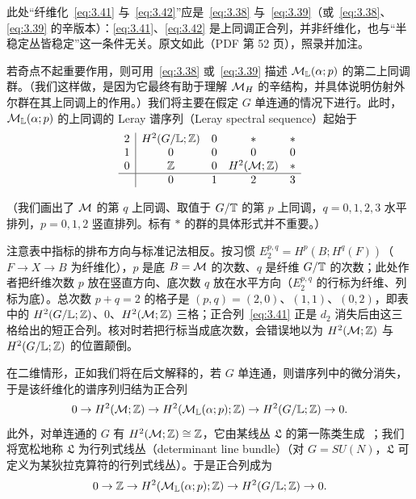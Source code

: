 \begin{yizhu}[原文疑误]此处“纤维化~\eqref{eq:3.41} 与~\eqref{eq:3.42}”应是~\eqref{eq:3.38} 与~\eqref{eq:3.39}（或~\eqref{eq:3.38}、\eqref{eq:3.39} 的辛版本）：\eqref{eq:3.41}、\eqref{eq:3.42} 是上同调正合列，并非纤维化，也与“半稳定丛皆稳定”这一条件无关。原文如此（PDF 第 52 页），照录并加注。\end{yizhu}

若奇点不起重要作用，则可用~\eqref{eq:3.38} 或~\eqref{eq:3.39} 描述 ${\mathcal{M}}_\mathbb{L}(\alpha;p)$ 的第二上同调群。（我们这样做，是因为它最终有助于理解 ${{\mathcal{M}}_H}$ 的辛结构，并具体说明仿射外尔群在其上同调上的作用。）我们将主要在假定 $G$ 单连通的情况下进行。此时，${\mathcal{M}}_\mathbb{L}(\alpha;p)$ 的上同调的 Leray 谱序列（Leray spectral sequence）起始于
\setcounter{equation}{39}
\begin{equation}\label{eq:3.40}
  \begin{array}{c|cccc} 2 & H^2(G/\mathbb{L};\mathbb{Z}) & 0 & * & *\\ 1 & 0 & 0 & 0 & 0\\ 0 & \mathbb{Z} & 0 & H^2(\mathcal{M};\mathbb{Z}) & *\\ \hline   & 0 & 1 & 2 & 3\end{array}
\end{equation}

（我们画出了 ${\mathcal{M}}$ 的第 $q$ 上同调、取值于 $G/{\mathbb{T}}$ 的第 $p$ 上同调，$q=0,1,2,3$ 水平排列，$p=0,1,2$ 竖直排列。标有 $*$ 的群的具体形式并不重要。）

\begin{yizhu}[易错点]注意表中指标的排布方向与标准记法相反。按习惯 $E_2^{p,q}=H^p(B;H^q(F))$（$F\to X\to B$ 为纤维化），$p$ 是底 $B={\mathcal{M}}$ 的次数、$q$ 是纤维 $G/{\mathbb{T}}$ 的次数；此处作者把纤维次数 $p$ 放在竖直方向、底次数 $q$ 放在水平方向（$E_2^{p,q}$ 的行标为纤维、列标为底）。总次数 $p+q=2$ 的格子是 $(p,q)=(2,0)$、$(1,1)$、$(0,2)$，即表中的 $H^2(G/\mathbb{L};{\mathbb{Z}})$、$0$、$H^2({\mathcal{M}};{\mathbb{Z}})$ 三格；正合列~\eqref{eq:3.41} 正是 $d_2$ 消失后由这三格给出的短正合列。核对时若把行标当成底次数，会错误地以为 $H^2({\mathcal{M}};{\mathbb{Z}})$ 与 $H^2(G/\mathbb{L};{\mathbb{Z}})$ 的位置颠倒。\end{yizhu}

在二维情形，正如我们将在后文解释的，若 $G$ 单连通，则谱序列中的微分消失，于是该纤维化的谱序列归结为正合列
\setcounter{equation}{40}
\begin{equation}\label{eq:3.41}
  0\to H^2({\mathcal{M}};{\mathbb{Z}})\to
H^2({\mathcal{M}}_\mathbb{L}(\alpha;p);{\mathbb{Z}})\to H^2(G/\mathbb{L};{\mathbb{Z}})\to 0.
\end{equation}
此外，对单连通的 $G$ 有 $H^2({\mathcal{M}};{\mathbb{Z}})\cong {\mathbb{Z}}$，它由某线丛 $\mathfrak L$ 的第一陈类生成~\cite{ref53,ref54}；我们将宽松地称 $\mathfrak L$ 为行列式线丛（determinant line bundle）（对 $G=SU(N)$，$\mathfrak L$ 可定义为某狄拉克算符的行列式线丛）。于是正合列成为
\setcounter{equation}{41}
\begin{equation}\label{eq:3.42}
  0\to {\mathbb{Z}}\to H^2({\mathcal{M}}_\mathbb{L}(\alpha;p);{\mathbb{Z}})\to H^2(G/\mathbb{L};{\mathbb{Z}})\to 0.
\end{equation}

